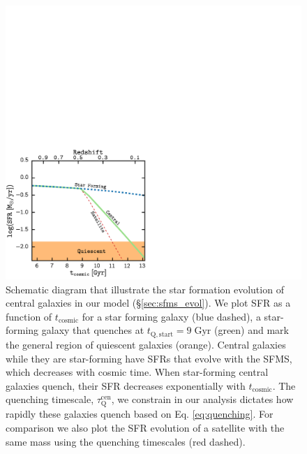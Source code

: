 \documentclass[iop,apj,tighten,twocolappendix,numberedappendix]{emulateapj}
\begin{document}
\begin{figure}
\begin{center}
\includegraphics[scale=0.5]{figs/SFH_SchematicDemo.pdf}
\caption{Schematic diagram that illustrate the star formation evolution of 
 central galaxies in our model (\S \ref{sec:sfms_evol}). 
We plot SFR as a function of $t_\mathrm{cosmic}$ for a star forming galaxy 
(blue dashed), a star-forming galaxy that quenches at 
$t_\mathrm{Q, start} = 9\;\mathrm{Gyr}$ (green) and mark the general region 
of quiescent galaxies (orange). Central galaxies while they are star-forming 
have SFRs that evolve with the SFMS, which decreases with cosmic 
time. When star-forming central galaxies quench, their SFR decreases 
exponentially with $t_\mathrm{cosmic}$. The quenching timescale, 
$\tau_\mathrm{Q}^\mathrm{cen}$, we constrain in our analysis dictates 
how rapidly these galaxies quench based on Eq. \ref{eq:quenching}. 
For comparison we also plot the SFR evolution of a satellite 
with the same mass using the \cite{Wetzel:2013aa} quenching timescales 
(red dashed).}
\label{fig:SFHdemo}
\end{center}
\end{figure}

\end{document}
